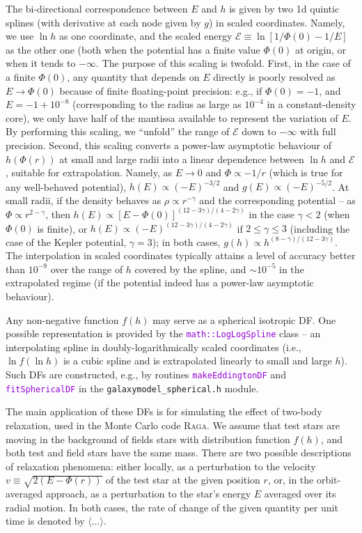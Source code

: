 \documentclass[12pt]{article}
\newcommand{\Raga} {\textsc{Raga}\xspace}
\newcommand{\ttt}[1]{\textcolor{darkviolet}{\texttt{#1}}}
\newcommand{\scE}{\mathscr E}
\begin{document}
The bi-directional correspondence between $E$ and $h$ is given by two 1d quintic splines (with derivative at each node given by $g$) in scaled coordinates. Namely, we use $\ln h$ as one coordinate, and the scaled energy $\scE \equiv \ln[1/\Phi(0) - 1/E]$ as the other one (both when the potential has a finite value $\Phi(0)$ at origin, or when it tends to $-\infty$. The purpose of this scaling is twofold. First, in the case of a finite $\Phi(0)$, any quantity that depends on $E$ directly is poorly resolved as $E\to \Phi(0)$ because of finite floating-point precision: e.g., if $\Phi(0)=-1$, and $E=-1+10^{-8}$ (corresponding to the radius as large as $10^{-4}$ in a constant-density core), we only have half of the mantissa available to represent the variation of $E$. By performing this scaling, we ``unfold'' the range of $\scE$ down to $-\infty$ with full precision. Second, this scaling converts a power-law asymptotic behaviour of $h(\Phi(r))$ at small and large radii into a linear dependence between $\ln h$ and $\scE$, suitable for extrapolation. Namely, as $E \to 0$ and $\Phi \propto -1/r$ (which is true for any well-behaved potential), $h(E)\propto (-E)^{-3/2}$ and $g(E)\propto (-E)^{-5/2}$. At small radii, if the density behaves as $\rho \propto r^{-\gamma}$ and the corresponding potential -- as $\Phi \propto r^{2-\gamma}$, then $h(E) \propto [E-\Phi(0)]^{(12-3\gamma)/(4-2\gamma)}$ in the case $\gamma<2$ (when $\Phi(0)$ is finite), or $h(E) \propto (-E)^{(12-3\gamma)/(4-2\gamma)}$ if $2\le \gamma \le 3$ (including the case of the Kepler potential, $\gamma=3$); in both cases, $g(h) \propto h^{(8-\gamma)/(12-3\gamma)}$.
The interpolation in scaled coordinates typically attains a level of accuracy better than $10^{-9}$ over the range of $h$ covered by the spline, and $\sim 10^{-5}$ in the extrapolated regime (if the potential indeed has a power-law asymptotic behaviour).

Any non-negative function $f(h)$ may serve as a spherical isotropic DF. One possible representation is provided by the \ttt{math::LogLogSpline} class -- an interpolating spline in doubly-logarithmically scaled coordinates (i.e., $\ln f (\ln h)$ is a cubic spline and is extrapolated linearly to small and large $h$). Such DFs are constructed, e.g., by routines \ttt{makeEddingtonDF} and \ttt{fitSphericalDF} in the \texttt{galaxymodel_spherical.h} module.

The main application of these DFs is for simulating the effect of two-body relaxation, used in the Monte Carlo code \Raga \cite{Vasiliev2015}. We assume that test stars are moving in the background of fields stars with distribution function $f(h)$, and both test and field stars have the same mass. There are two possible descriptions of relaxation phenomena: either locally, as a perturbation to the velocity $v\equiv \sqrt{2(E-\Phi(r))}$ of the test star at the given position $r$, or, in the orbit-averaged approach, as a perturbation to the star's energy $E$ averaged over its radial motion.
In both cases, the rate of change of the given quantity per unit time is denoted by $\langle \dots \rangle$.
\end{document}
